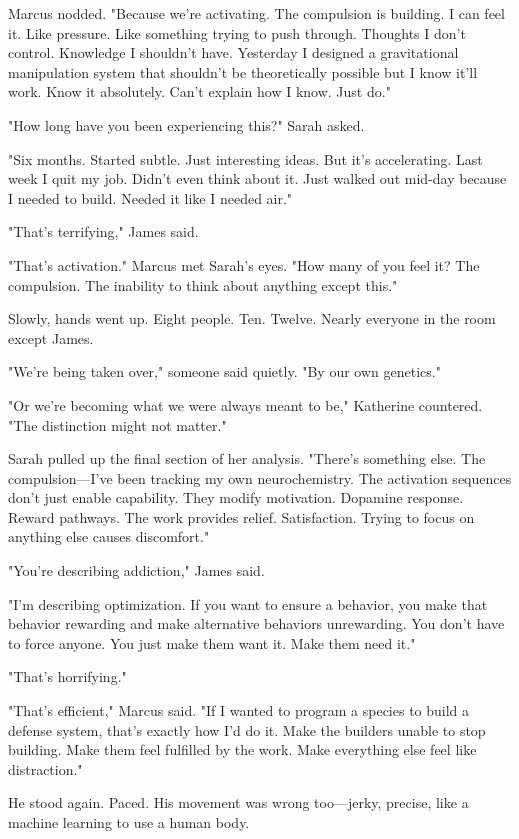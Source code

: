 Marcus nodded. "Because we're activating. The compulsion is building. I can feel it. Like pressure. Like something trying to push through. Thoughts I don't control. Knowledge I shouldn't have. Yesterday I designed a gravitational manipulation system that shouldn't be theoretically possible but I know it'll work. Know it absolutely. Can't explain how I know. Just do."

"How long have you been experiencing this?" Sarah asked.

"Six months. Started subtle. Just interesting ideas. But it's accelerating. Last week I quit my job. Didn't even think about it. Just walked out mid-day because I needed to build. Needed it like I needed air."

"That's terrifying," James said.

"That's activation." Marcus met Sarah's eyes. "How many of you feel it? The compulsion. The inability to think about anything except this."

Slowly, hands went up. Eight people. Ten. Twelve. Nearly everyone in the room except James.

"We're being taken over," someone said quietly. "By our own genetics."

"Or we're becoming what we were always meant to be," Katherine countered. "The distinction might not matter."

Sarah pulled up the final section of her analysis. "There's something else. The compulsion—I've been tracking my own neurochemistry. The activation sequences don't just enable capability. They modify motivation. Dopamine response. Reward pathways. The work provides relief. Satisfaction. Trying to focus on anything else causes discomfort."

"You're describing addiction," James said.

"I'm describing optimization. If you want to ensure a behavior, you make that behavior rewarding and make alternative behaviors unrewarding. You don't have to force anyone. You just make them want it. Make them need it."

"That's horrifying."

"That's efficient," Marcus said. "If I wanted to program a species to build a defense system, that's exactly how I'd do it. Make the builders unable to stop building. Make them feel fulfilled by the work. Make everything else feel like distraction."

He stood again. Paced. His movement was wrong too—jerky, precise, like a machine learning to use a human body.

